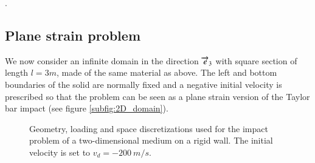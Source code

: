 .


\subsection{Plane strain problem}
\label{sec:plane-strain-problem}
We now consider an infinite domain in the direction ${\overrightarrow{e}}_3$ with square section of length $l=3m$, made of the same material as above.
The left and bottom boundaries of the solid are normally fixed and a negative initial velocity is prescribed so that the problem can be seen as a plane strain version of the Taylor bar impact (see figure \ref{subfig:2D_domain}).
\begin{figure}[ht]
  \centering
   \qquad
  \caption{Geometry, loading and space discretizations used for the impact problem of a two-dimensional medium on a rigid wall. The initial velocity is set to $v_d=-200 \: m/s$.}
  \label{fig:PS_domain}
\end{figure}


